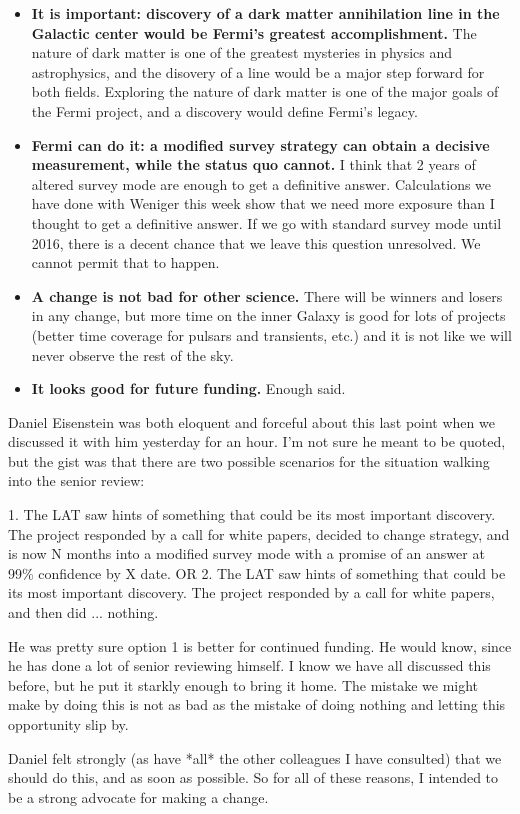 \documentclass[aps,prd,superscriptaddress,showpacs]{revtex4}
\begin{document}
\begin{itemize}

\item{\bf It is important: discovery of a dark matter annihilation line in the
    Galactic center would be Fermi's greatest accomplishment.}  The nature of
  dark matter is one of the greatest mysteries in physics and astrophysics,
  and the disovery of a line would be a major step forward for both fields.
  Exploring the nature of dark matter is one of the major goals of the Fermi
  project, and a discovery would define Fermi's legacy.

\item{\bf Fermi can do it: a modified survey strategy can obtain a decisive
    measurement, while the status quo cannot.}  I think that 2 years of
  altered survey mode are enough to get a definitive answer.  Calculations we
  have done with Weniger this week show that we need more exposure than I
  thought to get a definitive answer.  If we go with standard survey mode
  until 2016, there is a decent chance that we leave this question unresolved.
  We cannot permit that to happen.

\item{\bf A change is not bad for other science.}  There will be winners and
  losers in any change, but more time on the inner Galaxy is good for lots of
  projects (better time coverage for pulsars and transients, etc.) and it is
  not like we will never observe the rest of the sky.

\item{\bf It looks good for future funding.}  Enough said. 

\end{itemize}

Daniel Eisenstein was both eloquent and forceful about this last point
when we discussed it with him yesterday for an hour.  I'm not sure he
meant to be quoted, but the gist was that there are two possible
scenarios for the situation walking into the senior review:

1.  The LAT saw hints of something that could be its most important
discovery.  The project responded by a call for white papers, decided
to change strategy, and is now N months into a modified survey mode
with a promise of an answer at 99\% confidence by X date.
OR
2.  The LAT saw hints of something that could be its most important
discovery.  The project responded by a call for white papers, and then
did ... nothing.

He was pretty sure option 1 is better for continued funding.  He would
know, since he has done a lot of senior reviewing himself.  I know we
have all discussed this before, but he put it starkly enough to bring
it home.  The mistake we might make by doing this is not as bad as the
mistake of doing nothing and letting this opportunity slip by.

Daniel felt strongly (as have *all* the other colleagues I have
consulted) that we should do this, and as soon as possible.  So for
all of these reasons, I intended to be a strong advocate for making a
change.



\clearpage

\end{document}
